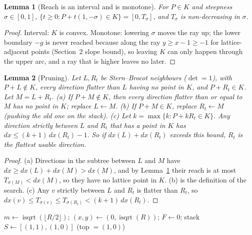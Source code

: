 \documentclass[11pt]{article}
\newtheorem{lemma}{Lemma}
\theoremstyle{remark}
\newcommand{\isqrt}{\operatorname{isqrt}}
\begin{document}
\begin{lemma}[Reach is an interval and is monotone]\label{lem:reach}
For $P\in K$ and steepness $\sigma\in[0,1]$, $\{t\ge0: P+t(1,-\sigma)\in K\}=[0,T_\sigma]$, and $T_\sigma$ is non-decreasing in $\sigma$.
\end{lemma}
\begin{proof}
Interval: $K$ is convex. Monotone: lowering $\sigma$ moves the ray up; the lower boundary $-g$ is never reached because along the ray $y\ge x-1\ge -1$ for lattice-adjacent points (Section~2 slope bound), so leaving $K$ can only happen through the upper arc, and a ray that is higher leaves no later.
\end{proof}

\begin{lemma}[Pruning]\label{lem:prune}
Let $L,R_t$ be Stern--Brocot neighbours ($\det=1$), with $P+L\notin K$, every direction flatter than $L$ having no point in $K$, and $P+R_t\in K$. Let $M=L+R_t$.
(a) If $P+M\notin K$, then every direction flatter than or equal to $M$ has no point in $K$; replace $L\leftarrow M$.
(b) If $P+M\in K$, replace $R_t\leftarrow M$ (pushing the old one on the stack).
(c) Let $k=\max\{k: P+kR_t\in K\}$. Any direction strictly between $L$ and $R_t$ that has a point in $K$ has $dx\le (k+1)\,dx(R_t)-1$. So if $dx(L)+dx(R_t)$ exceeds this bound, $R_t$ is the flattest usable direction.
\end{lemma}
\begin{proof}
(a) Directions in the subtree between $L$ and $M$ have $dx\ge dx(L)+dx(M)>dx(M)$, and by Lemma~\ref{lem:reach} their reach is at most $T_{\sigma(M)}<dx(M)$, so they have no lattice point in $K$. (b) is the definition of the search.
(c) Any $v$ strictly between $L$ and $R_t$ is flatter than $R_t$, so $dx(v)\le T_{\sigma(v)}\le T_{\sigma(R_t)}<(k+1)\,dx(R_t)$.
\end{proof}

\begin{algorithm}[t]
\caption{HullWalk$(R)$: computes $F=\sum_{x=1}^{m}\lfloor\sqrt{R-x^2}\rfloor$}
 
$m\gets\isqrt(\lfloor R/2\rfloor)$; $(x,y)\gets(0,\isqrt(R))$; $F\gets0$; stack $S\gets[(1,1),(1,0)]$ (top $=(1,0)$)\;
\end{algorithm}
\end{document}
